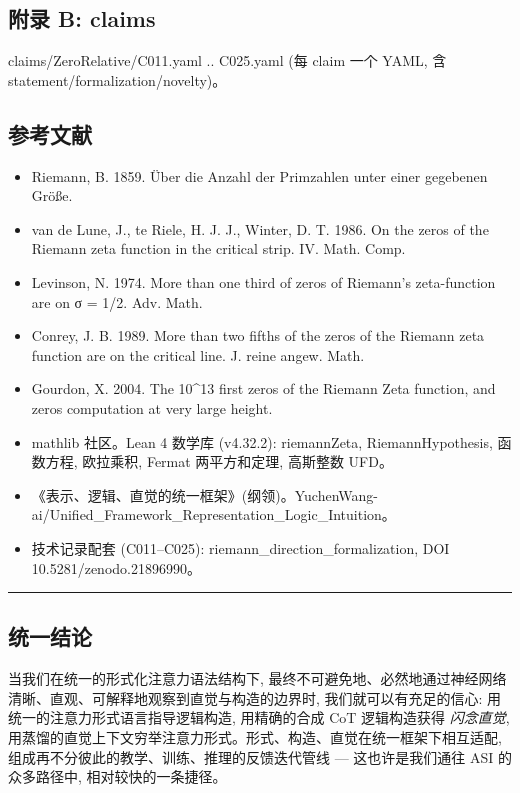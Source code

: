 \documentclass[
]{article}
\providecommand{\tightlist}{%
  \setlength{\itemsep}{0pt}\setlength{\parskip}{0pt}}
\begin{document}
\subsection{附录 B: claims}\label{ux9644ux5f55-b-claims}

claims/ZeroRelative/C011.yaml .. C025.yaml (每 claim 一个 YAML, 含
statement/formalization/novelty)。

\subsection{参考文献}\label{ux53c2ux8003ux6587ux732e}

\begin{itemize}
\tightlist
\item
  Riemann, B. 1859. Über die Anzahl der Primzahlen unter einer gegebenen
  Größe.
\item
  van de Lune, J., te Riele, H. J. J., Winter, D. T. 1986. On the zeros
  of the Riemann zeta function in the critical strip. IV. Math. Comp.
\item
  Levinson, N. 1974. More than one third of zeros of Riemann's
  zeta-function are on σ = 1/2. Adv. Math.
\item
  Conrey, J. B. 1989. More than two fifths of the zeros of the Riemann
  zeta function are on the critical line. J. reine angew. Math.
\item
  Gourdon, X. 2004. The 10\^{}13 first zeros of the Riemann Zeta
  function, and zeros computation at very large height.
\item
  mathlib 社区。Lean 4 数学库 (v4.32.2): riemannZeta, RiemannHypothesis,
  函数方程, 欧拉乘积, Fermat 两平方和定理, 高斯整数 UFD。
\item
  《表示、逻辑、直觉的统一框架》(纲领)。YuchenWang-ai/Unified\_Framework\_Representation\_Logic\_Intuition。
\item
  技术记录配套 (C011--C025): riemann\_direction\_formalization, DOI
  10.5281/zenodo.21896990。
\end{itemize}

\begin{center}\rule{0.5\linewidth}{0.5pt}\end{center}

\subsection{统一结论}\label{ux7edfux4e00ux7ed3ux8bba}

当我们在统一的形式化注意力语法结构下,
最终不可避免地、必然地通过神经网络清晰、直观、可解释地观察到直觉与构造的边界时,
我们就可以有充足的信心: 用统一的注意力形式语言指导逻辑构造, 用精确的合成
CoT 逻辑构造获得 \emph{闪念直觉},
用蒸馏的直觉上下文穷举注意力形式。形式、构造、直觉在统一框架下相互适配,
组成再不分彼此的教学、训练、推理的反馈迭代管线 --- 这也许是我们通往 ASI
的众多路径中, 相对较快的一条捷径。
\end{document}
